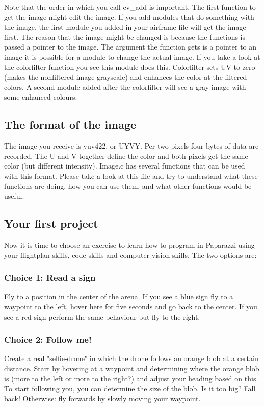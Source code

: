 \documentclass{article}
\begin{document}
Note that the order in which you call cv\_add is important. The first function to get the image might edit the image. If you add modules that do something with the image, the first module you added in your airframe file will get the image first. The reason that the image might be changed is because the functions is passed a pointer to the image. 
The argument the function gets is a pointer to an image it is possible for a module to change the actual image. If you take a look at the colorfilter function you see this module does this. Colorfilter sets UV to zero (makes the nonfiltered image grayscale) and enhances the color at the filtered colors. A second module added after the colorfilter will see a gray image with some enhanced colours. 

\subsection*{The format of the image}
The image you receive is yuv422, or UYVY. Per two pixels four bytes of data are recorded. The U and V together define the color and both pixels get the same color (but different intensity). Image.c has several functions that can be used with this format. Please take a look at this file and try to understand what these functions are doing, how you can use them, and what other functions would be useful. 

\subsection*{Your first project}
Now it is time to choose an exercise to learn how to program in Paparazzi using your flightplan skills, code skills and computer vision skills. The two options are:

\subsubsection*{Choice 1: Read a sign}
Fly to a position in the center of the arena. If you see a blue sign fly to a waypoint to the left, hover here for five seconds and go back to the center. If you see a red sign perform the same behaviour but fly to the right. 

\subsubsection*{Choice 2: Follow me!}
Create a real "selfie-drone" in which the drone follows an orange blob at a certain distance. 
Start by hovering at a waypoint and determining where the orange blob is (more to the left or more to the right?) and adjust your heading based on this. 
To start following you, you can determine the size of the blob. Is it too big? Fall back! Otherwise: fly forwards by slowly moving your waypoint.
\end{document}
